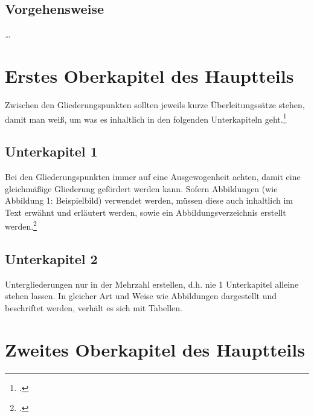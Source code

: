 \documentclass[12pt,toc=bib,toc=listof]{scrreprt}
\begin{document}

\section{Vorgehensweise} %
\label{sec:vorgehensweise}

\ldots


\chapter{Erstes Oberkapitel des Hauptteils} %
\label{sec:ersteskapitel}

Zwischen den Gliederungspunkten sollten jeweils kurze Überleitungssätze stehen, damit man weiß, um was es inhaltlich in den folgenden Unterkapiteln geht.\footcite [Vgl.] []{GPL}


\section{Unterkapitel 1} %
\label{sec:unterkapitel1}

Bei den Gliederungspunkten immer auf eine Ausgewogenheit achten, damit eine gleichmäßige Gliederung gefördert werden kann. Sofern Abbildungen (wie Abbildung 1: Beispielbild) verwendet werden, müssen diese auch inhaltlich im Text erwähnt und erläutert werden, sowie ein Abbildungsverzeichnis erstellt werden.\footcite [Vgl.] [] {hhnwin}


\section{Unterkapitel 2} %
\label{sec:unterkapitel2}

Untergliederungen nur in der Mehrzahl erstellen, d.h. nie 1 Unterkapitel alleine stehen lassen.
In gleicher Art und Weise wie Abbildungen dargestellt und beschriftet werden, verhält es sich mit Tabellen.


\chapter{Zweites Oberkapitel des Hauptteils} %
\label{sec:zweiteskapitel}
\end{document}
